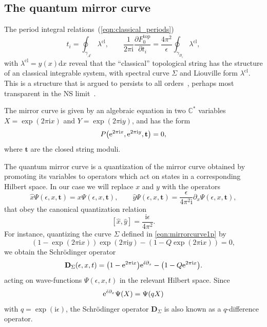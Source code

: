 \documentclass[pdftex]{sigma}
\numberwithin{equation}{section}
\begin{document}
\subsection{The quantum mirror curve}\label{sec:quantummirrorcurve}

The period integral relations~(\ref{eqn:classical_periods})
\begin{equation*}
t_i = \oint_{\gamma_{A^i}} \lambda^\mathrm{cl}, \qquad \frac{1}{2 \pi \mathrm{i}} \frac{\partial F^\mathrm{top}_0}{\partial t_i} = \frac{4 \pi^2}{\epsilon} \oint_{\gamma_{B_i}} \lambda^\mathrm{cl},
\end{equation*}
with $\lambda^{\mathrm{cl}}=y(x) \mathrm{d}x $
reveal that the ``classical'' topological string has the structure of an classical integrable system, with spectral curve $\Sigma$ and Liouville form $\lambda^{\mathrm{cl}}$. This is a structure that is argued to persists to all orders~\cite{ADKMV}, perhaps most transparent in the NS limit~\cite{NS}.

The mirror curve is given by an algebraic equation in two $\mathbb{C}^*$ variables $X=\exp(2\pi \mathrm{i} x)$ and $Y=\exp(2\pi \mathrm{i} y)$, and has the form
\begin{equation*}
 P\big({\rm e}^{2\pi \mathrm{i} x},{\rm e}^{2\pi \mathrm{i} y},\mathbf{t}\big)=0,
 \end{equation*}
where $\mathbf{t}$ are the closed string moduli.

The quantum mirror curve is a quantization of the mirror curve obtained by promoting its variables to operators which act on states in a corresponding Hilbert space. In our case we will replace $x$ and $y$ with the operators
\begin{equation*}
\hat{x} \Psi(\epsilon,x,\mathbf{t}) = x \Psi (\epsilon,x,\mathbf{t}), \qquad \hat{y} \Psi(\epsilon,x,\mathbf{t}) = \frac{\epsilon}{4\pi^2\mathrm{i}} \partial_x \Psi (\epsilon,x,\mathbf{t}),
\end{equation*}
that obey the canonical quantization relation \begin{equation*}\left[\hat{x},\hat{y} \right]= \frac{\mathrm{i} \epsilon}{4\pi^2}.\end{equation*}
For instance, quantizing the curve $\Sigma$ defined in \eqref{eqn:mirrorcurve1p} by
\begin{equation*}
 (1-\exp(2\pi \mathrm{i} x) ) \exp(2\pi \mathrm{i} y) - (1 - Q \exp(2\pi \mathrm{i} x) ) = 0,
\end{equation*}
we obtain the Schr\"odinger operator
\begin{equation}\label{eqn:diffDX1}
 \mathbf{D}_\Sigma (\epsilon,x,t) = \big(1-{\rm e}^{2 \pi \mathrm{i} x}\big) {\rm e}^{\check{\epsilon} \partial_x} - \big(1 - Q {\rm e}^{2 \pi \mathrm{i} x}\big).
\end{equation}
acting on wave-functions $\Psi(\epsilon,x,t)$ in the relevant Hilbert space. Since
\begin{equation*}
 {\rm e}^{\check{\epsilon} \partial_x} \Psi(X) = \Psi(q X)
\end{equation*}
with $q = \exp (\mathrm{i} \epsilon)$, the Schr\"odinger operator $\mathbf{D}_\Sigma$ is also known as a $q$-difference operator.
\end{document}
